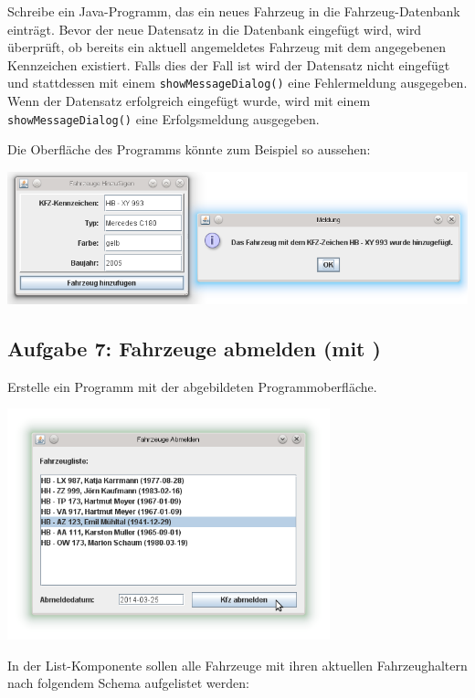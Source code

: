 Schreibe ein Java-Programm, das ein neues Fahrzeug in die Fahrzeug-Datenbank
einträgt. Bevor der neue Datensatz in die Datenbank eingefügt wird, wird
überprüft, ob bereits ein aktuell angemeldetes Fahrzeug mit dem angegebenen
Kennzeichen existiert. Falls dies der Fall ist wird der Datensatz nicht
eingefügt und stattdessen mit einem \lstinline|showMessageDialog()| eine
Fehlermeldung ausgegeben. Wenn der Datensatz erfolgreich eingefügt wurde, wird
mit einem \lstinline|showMessageDialog()| eine Erfolgsmeldung ausgegeben.

Die Oberfläche des Programms könnte zum Beispiel so aussehen:

\begin{center}
\includegraphics[width=1.0\textwidth]{./inf/SEKII/44_Abi-Training/FahrzeugeHinzufuegen.png}
\end{center}


\subsection{Aufgabe 7: Fahrzeuge abmelden (mit )}

Erstelle ein Programm mit der abgebildeten Programmoberfläche.

\begin{center}
\includegraphics[width=0.7\textwidth]{./inf/SEKII/44_Abi-Training/FahrzeugeAbmeldenMitJList.png}
\end{center}

In der List-Komponente sollen alle Fahrzeuge mit ihren aktuellen
Fahrzeughaltern nach folgendem Schema aufgelistet werden:

